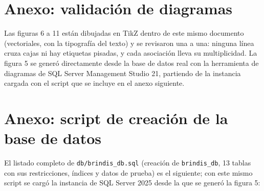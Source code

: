 \documentclass[12pt]{article}
\begin{document}
\section{Anexo: validaci\'on de diagramas}
Las figuras 6 a 11 est\'an dibujadas en TikZ dentro de este mismo documento (vectoriales, con la tipograf\'ia del texto) y se revisaron una a una: ninguna l\'inea cruza cajas ni hay etiquetas pisadas, y cada asociaci\'on lleva su multiplicidad. La figura 5 se gener\'o directamente desde la base de datos real con la herramienta de diagramas de SQL Server Management Studio 21, partiendo de la instancia cargada con el script que se incluye en el anexo siguiente.
\section{Anexo: script de creaci\'on de la base de datos}\label{anx:sql}
El listado completo de \texttt{db/brindis\_db.sql} (creaci\'on de \texttt{brindis\_db}, 13 tablas con sus restricciones, {\'i}ndices y datos de prueba) es el siguiente; con este mismo script se carg\'o la instancia de SQL Server 2025 desde la que se gener\'o la figura 5:

\end{document}
